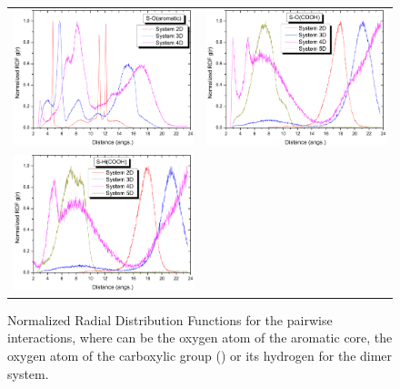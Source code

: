 \begin{figure}[htb]
	\begin{tabular}{cc}
		\includegraphics[width=0.45\columnwidth]{image/rdf_SOar} &
		\includegraphics[width=0.45\columnwidth]{image/rdf_SOcarb} \\
		\includegraphics[width=0.45\columnwidth]{image/rdf_SHcarb} & \\        
	\end{tabular}
	\caption{Normalized Radial Distribution Functions for the  pairwise interactions, where  can be the oxygen atom of the aromatic core, the oxygen atom of the carboxylic group () or its hydrogen for the dimer system.}
	\label{pap:fig16}
\end{figure}	


